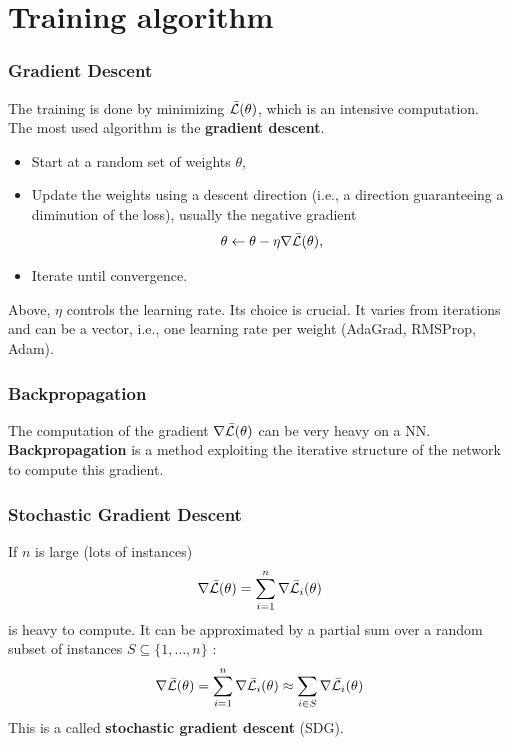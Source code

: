 \section{Training algorithm}
\begin{frame}
\frametitle{Gradient Descent}
The training is done by minimizing $\bar{\cal L}(\theta)$, which is an intensive computation.\\ 
\vspace{0.3cm}
The most used algorithm is the {\bf gradient descent}. 
\begin{itemize}
\item Start at a random set of weights $\theta$,
\item Update the weights using a descent direction (i.e., a direction guaranteeing a diminution of the loss), usually the negative gradient 
$$
\theta \leftarrow \theta - \eta \nabla \bar{\cal L}(\theta),
$$ 
\item Iterate until convergence.
\end{itemize}
Above, $\eta$ controls the learning rate. Its choice is crucial. It varies from iterations and can be a vector, i.e., one learning rate per weight (AdaGrad, RMSProp, Adam). 
\end{frame}
\begin{frame}
\frametitle{Backpropagation}
The computation of the gradient $\nabla \bar{\cal L}(\theta)$ can be very heavy on a NN.\\ 
\vspace{0.3cm}
{\bf Backpropagation} is a method exploiting the iterative structure of the network to compute this gradient. 
\end{frame}
\begin{frame}
\frametitle{Stochastic Gradient Descent}
If $n$ is large (lots of instances) 
$$
\nabla \bar{\cal L}(\theta)=\sum_{i=1}^n \nabla \bar{\cal L}_i(\theta)
$$ 
is heavy to compute. It can be approximated by a partial sum over a random subset of instances $S\subseteq \{1,\ldots,n\}$ : 
$$
\nabla \bar{\cal L}(\theta)=\sum_{i=1}^n \nabla \bar{\cal L}_i(\theta) \approx \sum_{i \in S} \nabla \bar{\cal L}_i(\theta)
$$ 
This is a called {\bf stochastic gradient descent} (SDG). 
\end{frame}
